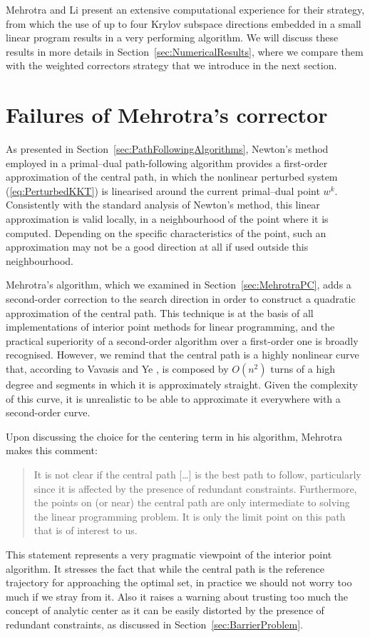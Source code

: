 Mehrotra and Li \cite{MehrotraLi} present an extensive 
computational experience for their strategy, from which 
the use of up to four Krylov subspace directions embedded in a small
linear program results in a very performing algorithm.
We will discuss these results in more details in 
Section~\ref{sec:NumericalResults}, where we compare them with
the weighted correctors strategy that we introduce in the
next section.


%
%
\section{Failures of Mehrotra's corrector}

As presented in Section~\ref{sec:PathFollowingAlgorithms},
Newton's method employed in a primal--dual path-following algorithm
provides a first-order approximation of the central path, in which
the nonlinear perturbed \KKT system (\ref{eq:PerturbedKKT}) 
is linearised around the current primal--dual point $w^k$. Consistently with 
the standard analysis of Newton's method, this linear approximation 
is valid locally, in a neighbourhood of the point where 
it is computed. Depending on the specific characteristics of the point, 
such an approximation may not be a good direction at all 
if used outside this neighbourhood.

Mehrotra's algorithm, which we examined in 
Section~\ref{sec:MehrotraPC}, adds a second-order correction to the search 
direction in order to construct a quadratic approximation 
of the central path. This technique is at the basis of all
implementations of interior point methods for linear programming,
and the practical superiority of a second-order algorithm over 
a first-order one is broadly recognised.
However, we remind that 
the central path is a highly nonlinear curve that, according 
to Vavasis and Ye \cite{VavasisYe}, is composed by $O(n^2)$ turns 
of a high degree and segments in which it is approximately straight. 
Given the complexity of this curve, it is unrealistic to be able 
to approximate it everywhere with a second-order curve.

Upon discussing the choice for the centering term in his algorithm,
Mehrotra \cite{Mehrotra92} makes this comment:
\begin{quotation}
It is not clear if the central path [\ldots]
is the best path to follow, particularly since it
is affected by the presence of redundant constraints. Furthermore,
the points on (or near) the central path are only intermediate to
solving the linear programming problem. It is only the limit point 
on this path that is of interest to us.
\end{quotation}
This statement represents a very pragmatic viewpoint of the interior
point algorithm. It stresses the fact that while the central path
is the reference trajectory for approaching the optimal set,
in practice we should not worry too much if we stray from it.
Also it raises a warning about trusting too much the concept
of analytic center as it can be easily distorted by the presence
of redundant constraints, as discussed in Section~\ref{sec:BarrierProblem}.

